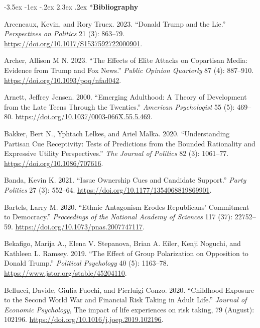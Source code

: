 \documentclass[
  10pt,
  letterpaper,
  DIV=11,
  numbers=noendperiod]{scrartcl}
\makeatletter
\newlength{\cslhangindent}
\newenvironment{CSLReferences}[2] %
 {\begin{list}{}{%
  \setlength{\itemindent}{0pt}
  \setlength{\leftmargin}{0pt}
  \setlength{\parsep}{0pt}
  \ifodd #1
   \setlength{\leftmargin}{\cslhangindent}
   \setlength{\itemindent}{-1\cslhangindent}
  \fi
  \setlength{\itemsep}{#2\baselineskip}}}
 {\end{list}}
\renewcommand\section{\@startsection{section}{1}{\z@}%
  {-3.5ex \@plus -1ex \@minus -.2ex}%
  {2.3ex \@plus.2ex}%
  {\normalfont\Large\bfseries\centering}}
\makeatother
\begin{document}
\section*{\texorpdfstring{\textbf{Bibliography}}{Bibliography}}\label{bibliography}

\label{refs}
\begin{CSLReferences}{1}{0}
Arceneaux, Kevin, and Rory Truex. 2023. {``Donald Trump and the Lie.''}
\emph{Perspectives on Politics} 21 (3): 863--79.
\url{https://doi.org/10.1017/S1537592722000901}.

Archer, Allison M N. 2023. {``The Effects of Elite Attacks on Copartisan
Media: Evidence from Trump and Fox News.''} \emph{Public Opinion
Quarterly} 87 (4): 887--910. \url{https://doi.org/10.1093/poq/nfad042}.

Arnett, Jeffrey Jensen. 2000. {``Emerging Adulthood: A Theory of
Development from the Late Teens Through the Twenties.''} \emph{American
Psychologist} 55 (5): 469--80.
\url{https://doi.org/10.1037/0003-066X.55.5.469}.

Bakker, Bert N., Yphtach Lelkes, and Ariel Malka. 2020. {``Understanding
Partisan Cue Receptivity: Tests of Predictions from the Bounded
Rationality and Expressive Utility Perspectives.''} \emph{The Journal of
Politics} 82 (3): 1061--77. \url{https://doi.org/10.1086/707616}.

Banda, Kevin K. 2021. {``Issue Ownership Cues and Candidate Support.''}
\emph{Party Politics} 27 (3): 552--64.
\url{https://doi.org/10.1177/1354068819869901}.

Bartels, Larry M. 2020. {``Ethnic Antagonism Erodes Republicans{'}
Commitment to Democracy.''} \emph{Proceedings of the National Academy of
Sciences} 117 (37): 22752--59.
\url{https://doi.org/10.1073/pnas.2007747117}.

Bekafigo, Marija A., Elena V. Stepanova, Brian A. Eiler, Kenji Noguchi,
and Kathleen L. Ramsey. 2019. {``The Effect of Group Polarization on
Opposition to Donald Trump.''} \emph{Political Psychology} 40 (5):
1163--78. \url{https://www.jstor.org/stable/45204110}.

Bellucci, Davide, Giulia Fuochi, and Pierluigi Conzo. 2020. {``Childhood
Exposure to the Second World War and Financial Risk Taking in Adult
Life.''} \emph{Journal of Economic Psychology}, The impact of life
experiences on risk taking, 79 (August): 102196.
\url{https://doi.org/10.1016/j.joep.2019.102196}.


\end{CSLReferences}
\end{document}
